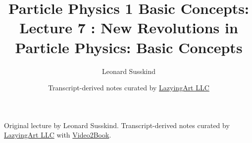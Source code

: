 \documentclass[11pt,oneside]{book}
\begin{document}
\frontmatter
\title{Particle Physics 1 Basic Concepts: Lecture 7 : New Revolutions in Particle Physics: Basic Concepts}
\author{Leonard Susskind}
\date{Transcript-derived notes curated by \href{https://lazying.art}{LazyingArt LLC}}
\maketitle
\begin{center}
\small Original lecture by Leonard Susskind. Transcript-derived notes curated by \href{https://lazying.art}{LazyingArt LLC} with \href{https://github.com/lachlanchen/Video2Book}{Video2Book}.
\end{center}
\clearpage
\mainmatter

\end{document}
